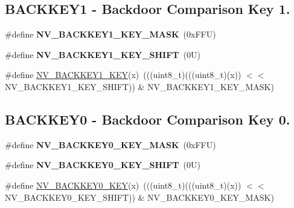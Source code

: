 \subsection*{B\+A\+C\+K\+K\+E\+Y1 -\/ Backdoor Comparison Key 1.}
\begin{DoxyCompactItemize}
\item 
\mbox{\label{group___n_v___register___masks_ga6cd05d78b113df7f3cb0d11d29931666}} 
\#define {\bfseries N\+V\+\_\+\+B\+A\+C\+K\+K\+E\+Y1\+\_\+\+K\+E\+Y\+\_\+\+M\+A\+SK}~(0x\+F\+F\+U)
\item 
\mbox{\label{group___n_v___register___masks_ga71418f17e11f902066ca404fbe473aef}} 
\#define {\bfseries N\+V\+\_\+\+B\+A\+C\+K\+K\+E\+Y1\+\_\+\+K\+E\+Y\+\_\+\+S\+H\+I\+FT}~(0\+U)
\item 
\#define \mbox{\hyperlink{group___n_v___register___masks_gac336f640b5b887647407bd036aabb060}{N\+V\+\_\+\+B\+A\+C\+K\+K\+E\+Y1\+\_\+\+K\+EY}}(x)~(((uint8\+\_\+t)(((uint8\+\_\+t)(x)) $<$$<$ N\+V\+\_\+\+B\+A\+C\+K\+K\+E\+Y1\+\_\+\+K\+E\+Y\+\_\+\+S\+H\+I\+FT)) \& N\+V\+\_\+\+B\+A\+C\+K\+K\+E\+Y1\+\_\+\+K\+E\+Y\+\_\+\+M\+A\+SK)
\end{DoxyCompactItemize}
\subsection*{B\+A\+C\+K\+K\+E\+Y0 -\/ Backdoor Comparison Key 0.}
\begin{DoxyCompactItemize}
\item 
\mbox{\label{group___n_v___register___masks_gafa0e31ca33d445d47d2fd89785e4ec9b}} 
\#define {\bfseries N\+V\+\_\+\+B\+A\+C\+K\+K\+E\+Y0\+\_\+\+K\+E\+Y\+\_\+\+M\+A\+SK}~(0x\+F\+F\+U)
\item 
\mbox{\label{group___n_v___register___masks_ga381e2b0a778da31fa6c795550e71aed8}} 
\#define {\bfseries N\+V\+\_\+\+B\+A\+C\+K\+K\+E\+Y0\+\_\+\+K\+E\+Y\+\_\+\+S\+H\+I\+FT}~(0\+U)
\item 
\#define \mbox{\hyperlink{group___n_v___register___masks_ga1806932e2ff643e0bd9d9718dd0921a4}{N\+V\+\_\+\+B\+A\+C\+K\+K\+E\+Y0\+\_\+\+K\+EY}}(x)~(((uint8\+\_\+t)(((uint8\+\_\+t)(x)) $<$$<$ N\+V\+\_\+\+B\+A\+C\+K\+K\+E\+Y0\+\_\+\+K\+E\+Y\+\_\+\+S\+H\+I\+FT)) \& N\+V\+\_\+\+B\+A\+C\+K\+K\+E\+Y0\+\_\+\+K\+E\+Y\+\_\+\+M\+A\+SK)
\end{DoxyCompactItemize}
